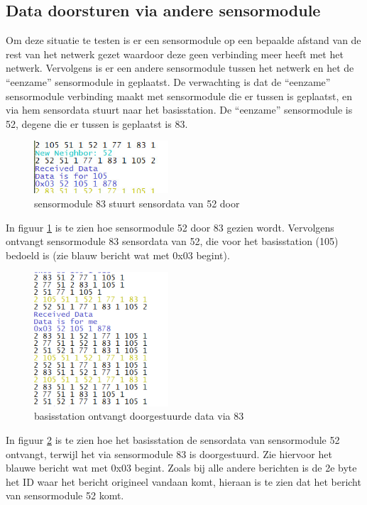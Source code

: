 \documentclass[a4paper, 11pt]{article}
\begin{document}
\subsection{Data doorsturen via andere sensormodule}
Om deze situatie te testen is er een sensormodule op een bepaalde afstand van de rest van het netwerk gezet waardoor deze geen verbinding meer heeft met het netwerk. Vervolgens is er een andere sensormodule tussen het netwerk en het de ``eenzame'' sensormodule in geplaatst. De verwachting is dat de ``eenzame'' sensormodule verbinding maakt met sensormodule die er tussen is geplaatst, en via hem sensordata stuurt naar het basisstation. De ``eenzame'' sensormodule is 52, degene die er tussen is geplaatst is 83.
\newpage
\begin{figure}[h!]
	\centering
	\includegraphics[width=5cm]{TestResults/DataViaBuur/83_StuurtDataDoor.jpeg}
	\caption{sensormodule 83 stuurt sensordata van 52 door} \label{Doorsturen83}
\end{figure}
In figuur \ref{Doorsturen83} is te zien hoe sensormodule 52 door 83 gezien wordt. Vervolgens ontvangt sensormodule 83 sensordata van 52, die voor het basisstation (105) bedoeld is (zie blauw bericht wat met 0x03 begint).
\begin{figure}[h!]
	\centering
	\includegraphics[width=5cm]{TestResults/DataViaBuur/DataRecevied105.png}
	\caption{basisstation ontvangt doorgestuurde data via 83} \label{Doorsturen105}
\end{figure}
In figuur \ref{Doorsturen105} is te zien hoe het basisstation de sensordata van sensormodule 52 ontvangt, terwijl het via sensormodule 83 is doorgestuurd. Zie hiervoor het blauwe bericht wat met 0x03 begint. Zoals bij alle andere berichten is de 2e byte het ID waar het bericht origineel vandaan komt, hieraan is te zien dat het bericht van sensormodule 52 komt.
\newpage



\end{document}
